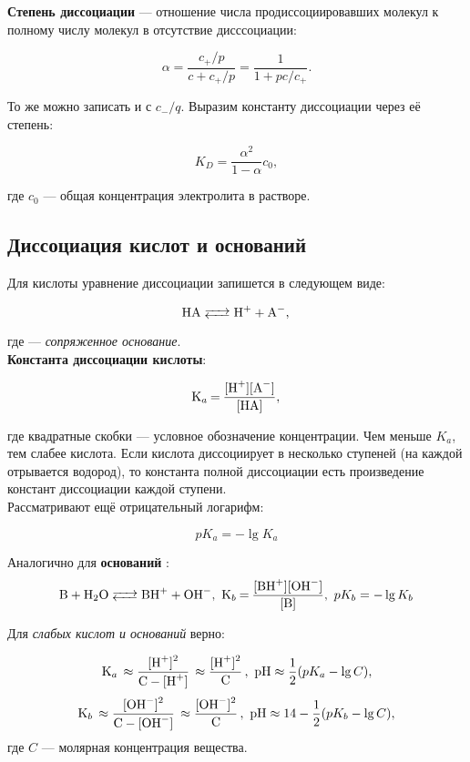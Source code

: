 \textbf{Степень диссоциации} --- отношение числа продиссоциировавших молекул к полному числу молекул в отсутствие дисссоциации:

$$ \alpha = \frac{c_{+}/p}{c + c_{+}/p} = \frac{1}{1 + pc/c_{+}}. $$

То же можно записать и с $c_{-}/q$. Выразим константу диссоциации через её степень:

$$K_D = \frac{\alpha^2}{1 - \alpha} c_0,$$

где $c_0$ --- общая концентрация электролита в растворе.

\subsection{Диссоциация кислот и оснований}

Для кислоты  уравнение диссоциации запишется в следующем виде:

\begin{equation*}
\ce{HA <--> H^+ + A^-,}
\end{equation*}

где  --- \textit{сопряженное основание}. \\

\textbf{Константа диссоциации кислоты}:

\begin{equation*}
\ce{K_a = \frac{[H^+][A^-]}{[HA]},}
\end{equation*}

где квадратные скобки --- условное обозначение концентрации. Чем меньше $K_a$, тем слабее кислота. Если кислота диссоциирует в несколько ступеней (на каждой отрывается водород), то константа полной диссоциации есть произведение констант диссоциации каждой ступени.\\

Рассматривают ещё отрицательный логарифм:

$$pK_a = -\lg{K_a}$$

Аналогично для \textbf{оснований} :
\begin{equation*}
\ce{B + H2O <--> BH^+ + OH^-,} \ \ce{K_b = \frac{[BH^+][OH^-]}{[B]},} \ pK_b = -\lg{K_b}
\end{equation*}

Для \textit{слабых кислот и оснований} верно:

\begin{equation*}
\ce{K_a \approx \frac{[H^+]^2}{C - [H^+]} \approx \frac{[H^+]^2}{C} ,\ pH} \approx \frac{1}{2}(pK_a - \lg{C}),
\end{equation*}
\begin{equation*}
\ce{K_b \approx \frac{[OH^-]^2}{C - [OH^-]} \approx \frac{[OH^-]^2}{C} ,\ pH} \approx 14 - \frac{1}{2}(pK_b - \lg{C}),
\end{equation*}
где $C$ --- молярная концентрация вещества.

